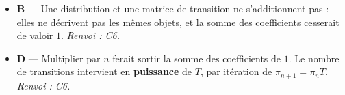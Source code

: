 \begin{itemize}
\begin{itemize}
    \item \textbf{B} — Une distribution et une matrice de transition ne s'additionnent pas : elles ne décrivent pas les mêmes objets, et la somme des coefficients cesserait de valoir $1$. \emph{Renvoi : C6.}
    \item \textbf{D} — Multiplier par $n$ ferait sortir la somme des coefficients de $1$. Le nombre de transitions intervient en \textbf{puissance} de $T$, par itération de $\pi_{n+1}=\pi_nT$. \emph{Renvoi : C6.}
  \end{itemize}
\end{itemize}
\fi
